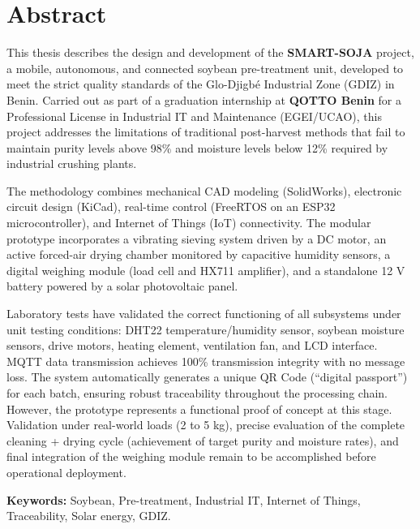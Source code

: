 \chapter*{Abstract}

This thesis describes the design and development of the \textbf{SMART-SOJA} project, a mobile, autonomous, and connected soybean pre-treatment unit, developed to meet the strict quality standards of the Glo-Djigbé Industrial Zone (GDIZ) in Benin. Carried out as part of a graduation internship at \textbf{QOTTO Benin} for a Professional License in Industrial IT and Maintenance (EGEI/UCAO), this project addresses the limitations of traditional post-harvest methods that fail to maintain purity levels above 98\% and moisture levels below 12\% required by industrial crushing plants.

The methodology combines mechanical CAD modeling (SolidWorks), electronic circuit design (KiCad), real-time control (FreeRTOS on an ESP32 microcontroller), and Internet of Things (IoT) connectivity. The modular prototype incorporates a vibrating sieving system driven by a DC motor, an active forced-air drying chamber monitored by capacitive humidity sensors, a digital weighing module (load cell and HX711 amplifier), and a standalone 12 V battery powered by a solar photovoltaic panel.

Laboratory tests have validated the correct functioning of all subsystems under unit testing conditions: DHT22 temperature/humidity sensor, soybean moisture sensors, drive motors, heating element, ventilation fan, and LCD interface. MQTT data transmission achieves 100\% transmission integrity with no message loss. The system automatically generates a unique QR Code (``digital passport'') for each batch, ensuring robust traceability throughout the processing chain. However, the prototype represents a functional proof of concept at this stage. Validation under real-world loads (2 to 5 kg), precise evaluation of the complete cleaning + drying cycle (achievement of target purity and moisture rates), and final integration of the weighing module remain to be accomplished before operational deployment.

\textbf{Keywords:} Soybean, Pre-treatment, Industrial IT, Internet of Things, Traceability, Solar energy, GDIZ.
